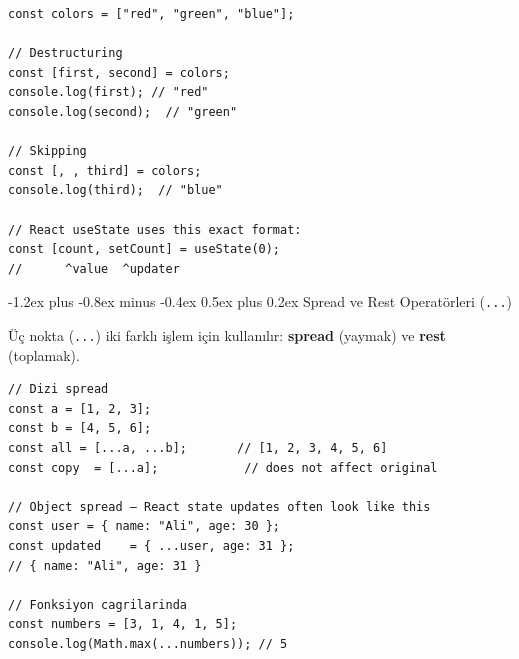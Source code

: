 \documentclass[12pt, a4paper]{article}
\makeatletter
\renewcommand{\subsection}{%
  \@startsection{subsection}{2}{\z@}%
    {-1.2ex plus -0.8ex minus -0.4ex}%
    {0.5ex plus 0.2ex}%
    {\normalfont\large\bfseries\sffamily\color{secondary}}%
}
\makeatother
\begin{document}
\vspace{6pt}

\begin{tcolorbox}[enhanced, colback=codebg, colframe=gray!30,
    colbacktitle=primary!85!black, coltitle=white, arc=4pt,
    title={\sffamily\bfseries\small Array Destructuring}]
\begin{lstlisting}[style=jsstyle]
const colors = ["red", "green", "blue"];

// Destructuring
const [first, second] = colors;
console.log(first); // "red"
console.log(second);  // "green"

// Skipping
const [, , third] = colors;
console.log(third);  // "blue"

// React useState uses this exact format:
const [count, setCount] = useState(0);
//      ^value  ^updater
\end{lstlisting}
\end{tcolorbox}

\subsection{Spread ve Rest Operatörleri (\texttt{...})}

Üç nokta (\texttt{...}) iki farklı işlem için kullanılır:
\textbf{spread} (yaymak) ve \textbf{rest} (toplamak).

\vspace{6pt}

\begin{tcolorbox}[enhanced, colback=codebg, colframe=gray!30,
    colbacktitle=primary!85!black, coltitle=white, arc=4pt,
    title={\sffamily\bfseries\small Spread — Dizi ve Nesne Birleştirme}]
\begin{lstlisting}[style=jsstyle]
// Dizi spread
const a = [1, 2, 3];
const b = [4, 5, 6];
const all = [...a, ...b];       // [1, 2, 3, 4, 5, 6]
const copy  = [...a];            // does not affect original

// Object spread — React state updates often look like this
const user = { name: "Ali", age: 30 };
const updated    = { ...user, age: 31 };
// { name: "Ali", age: 31 }

// Fonksiyon cagrilarinda
const numbers = [3, 1, 4, 1, 5];
console.log(Math.max(...numbers)); // 5
\end{lstlisting}
\end{tcolorbox}

\vspace{6pt}
\end{document}
